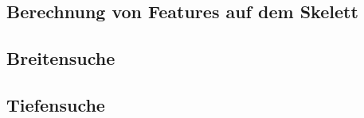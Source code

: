 \subsection{Berechnung von Features auf dem Skelett}
\subsection{Breitensuche}
\subsection{Tiefensuche}